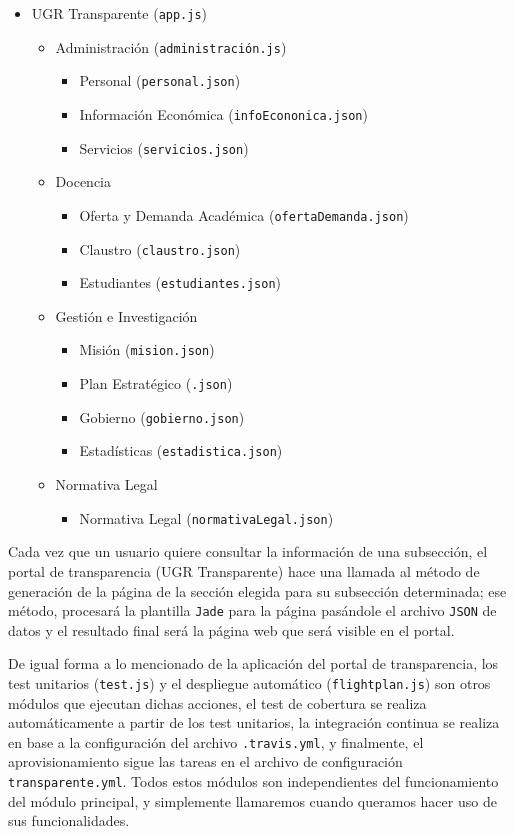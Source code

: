 \newpage
\begin{itemize}
 \item UGR Transparente ({\tt app.js})
 \begin{itemize}
  \item Administración ({\tt administración.js})
  \begin{itemize}
   \item Personal ({\tt personal.json})
   \item Información Económica ({\tt infoEcononica.json})
   \item Servicios ({\tt servicios.json})
  \end{itemize}
  \item Docencia
  \begin{itemize}
   \item Oferta y Demanda Académica ({\tt ofertaDemanda.json})
   \item Claustro ({\tt claustro.json})
   \item Estudiantes ({\tt estudiantes.json})
  \end{itemize}
  \item Gestión e Investigación
  \begin{itemize}
   \item Misión ({\tt mision.json})
   \item Plan Estratégico ({\tt .json})
   \item Gobierno ({\tt gobierno.json})
   \item Estadísticas ({\tt estadistica.json})
  \end{itemize}
  \item Normativa Legal
  \begin{itemize}
   \item Normativa Legal ({\tt normativaLegal.json})
  \end{itemize}
 \end{itemize}
\end{itemize}

Cada vez que un usuario quiere consultar la información de una subsección, el portal de transparencia (UGR Transparente) hace una llamada al método de generación de la página de la sección elegida para su subsección determinada; ese método, procesará la plantilla {\tt Jade} para la página pasándole el archivo {\tt JSON} de datos y el resultado final será la página web que será visible en el portal.

\bigskip
De igual forma a lo mencionado de la aplicación del portal de transparencia, los test unitarios ({\tt test.js}) y el despliegue automático ({\tt flightplan.js}) son otros módulos que ejecutan dichas acciones, el test de cobertura se realiza automáticamente a partir de los test unitarios, la integración continua se realiza en base a la configuración del archivo {\tt .travis.yml}, y finalmente, el aprovisionamiento sigue las tareas en el archivo de configuración {\tt transparente.yml}. Todos estos módulos son independientes del funcionamiento del módulo principal, y simplemente llamaremos cuando queramos hacer uso de sus funcionalidades.

